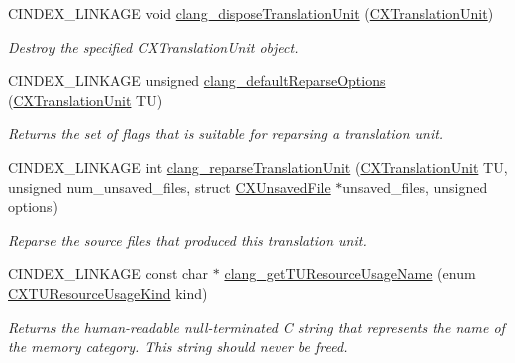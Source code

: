 \begin{DoxyCompactItemize}
\mbox{\label{group__CINDEX__TRANSLATION__UNIT_gaee753cb0036ca4ab59e48e3dff5f530a}} 
C\+I\+N\+D\+E\+X\+\_\+\+L\+I\+N\+K\+A\+GE void \hyperlink{group__CINDEX__TRANSLATION__UNIT_gaee753cb0036ca4ab59e48e3dff5f530a}{clang\+\_\+dispose\+Translation\+Unit} (\hyperlink{group__CINDEX_gacdb7815736ca709ce9a5e1ec2b7e16ac}{C\+X\+Translation\+Unit})
\begin{DoxyCompactList}\small\item\em Destroy the specified C\+X\+Translation\+Unit object. \end{DoxyCompactList}\item 
C\+I\+N\+D\+E\+X\+\_\+\+L\+I\+N\+K\+A\+GE unsigned \hyperlink{group__CINDEX__TRANSLATION__UNIT_gacd29e05f33062a81330fc4a8d255921b}{clang\+\_\+default\+Reparse\+Options} (\hyperlink{group__CINDEX_gacdb7815736ca709ce9a5e1ec2b7e16ac}{C\+X\+Translation\+Unit} TU)
\begin{DoxyCompactList}\small\item\em Returns the set of flags that is suitable for reparsing a translation unit. \end{DoxyCompactList}\item 
C\+I\+N\+D\+E\+X\+\_\+\+L\+I\+N\+K\+A\+GE int \hyperlink{group__CINDEX__TRANSLATION__UNIT_ga524e76bf2a809d037934d4be51ea448a}{clang\+\_\+reparse\+Translation\+Unit} (\hyperlink{group__CINDEX_gacdb7815736ca709ce9a5e1ec2b7e16ac}{C\+X\+Translation\+Unit} TU, unsigned num\+\_\+unsaved\+\_\+files, struct \hyperlink{structCXUnsavedFile}{C\+X\+Unsaved\+File} $\ast$unsaved\+\_\+files, unsigned options)
\begin{DoxyCompactList}\small\item\em Reparse the source files that produced this translation unit. \end{DoxyCompactList}\item 
\mbox{\label{group__CINDEX__TRANSLATION__UNIT_gabfa8cf56068a27a4dc1cc4caa1f178b1}} 
C\+I\+N\+D\+E\+X\+\_\+\+L\+I\+N\+K\+A\+GE const char $\ast$ \hyperlink{group__CINDEX__TRANSLATION__UNIT_gabfa8cf56068a27a4dc1cc4caa1f178b1}{clang\+\_\+get\+T\+U\+Resource\+Usage\+Name} (enum \hyperlink{group__CINDEX__TRANSLATION__UNIT_ga13810240df7c205de04daac58f956396}{C\+X\+T\+U\+Resource\+Usage\+Kind} kind)
\begin{DoxyCompactList}\small\item\em Returns the human-\/readable null-\/terminated C string that represents the name of the memory category. This string should never be freed. \end{DoxyCompactList}\item 

\end{DoxyCompactItemize}
